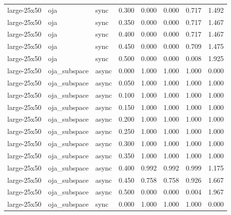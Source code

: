 \begin{tabular}{lllrrrrr}
large-25x50 & oja & sync & 0.300 & 0.000 & 0.000 & 0.717 & 1.492 \\

large-25x50 & oja & sync & 0.350 & 0.000 & 0.000 & 0.717 & 1.467 \\

large-25x50 & oja & sync & 0.400 & 0.000 & 0.000 & 0.717 & 1.467 \\

large-25x50 & oja & sync & 0.450 & 0.000 & 0.000 & 0.709 & 1.475 \\

large-25x50 & oja & sync & 0.500 & 0.000 & 0.000 & 0.008 & 1.925 \\

large-25x50 & oja\_subspace & async & 0.000 & 1.000 & 1.000 & 1.000 & 0.000 \\

large-25x50 & oja\_subspace & async & 0.050 & 1.000 & 1.000 & 1.000 & 1.000 \\

large-25x50 & oja\_subspace & async & 0.100 & 1.000 & 1.000 & 1.000 & 1.000 \\

large-25x50 & oja\_subspace & async & 0.150 & 1.000 & 1.000 & 1.000 & 1.000 \\

large-25x50 & oja\_subspace & async & 0.200 & 1.000 & 1.000 & 1.000 & 1.000 \\

large-25x50 & oja\_subspace & async & 0.250 & 1.000 & 1.000 & 1.000 & 1.000 \\

large-25x50 & oja\_subspace & async & 0.300 & 1.000 & 1.000 & 1.000 & 1.000 \\

large-25x50 & oja\_subspace & async & 0.350 & 1.000 & 1.000 & 1.000 & 1.000 \\

large-25x50 & oja\_subspace & async & 0.400 & 0.992 & 0.992 & 0.999 & 1.175 \\

large-25x50 & oja\_subspace & async & 0.450 & 0.758 & 0.758 & 0.926 & 1.667 \\

large-25x50 & oja\_subspace & async & 0.500 & 0.000 & 0.000 & 0.004 & 1.967 \\

large-25x50 & oja\_subspace & sync & 0.000 & 1.000 & 1.000 & 1.000 & 0.000 \\


\end{tabular}
